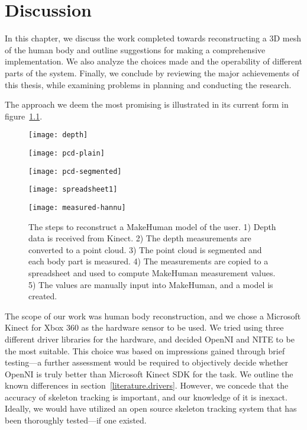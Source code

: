 \chapter{Discussion}

In this chapter, we discuss the work completed towards reconstructing a 3D mesh of the human body and outline suggestions for making a comprehensive implementation. We also analyze the choices made and the operability of different parts of the system. Finally, we conclude by reviewing the major achievements of this thesis, while examining problems in planning and conducting the research.

The approach we deem the most promising is illustrated in its current form in figure~\ref{fig:steps}.

\begin{figure}
    \centering
    
    \begin{minipage}{0.39\textwidth}
        \texttt{[image: depth]}
    \end{minipage}
    \begin{minipage}{0.60\textwidth}
        \texttt{[image: pcd-plain]}
    \end{minipage}

    \texttt{[image: pcd-segmented]}
    
    \begin{minipage}{0.56\textwidth}
        \texttt{[image: spreadsheet1]}
    \end{minipage}
    \begin{minipage}{0.43\textwidth}
        \texttt{[image: measured-hannu]}
    \end{minipage}
    
    \caption{The steps to reconstruct a MakeHuman model of the user. 1) Depth data is received from Kinect. 2) The depth measurements are converted to a point cloud. 3) The point cloud is segmented and each body part is measured. 4) The measurements are copied to a spreadsheet and used to compute MakeHuman measurement values. 5) The values are manually input into MakeHuman, and a model is created.}
    \label{fig:steps}
\end{figure}

\newtopic

The scope of our work was human body reconstruction, and we chose a Microsoft Kinect for Xbox 360 as the hardware sensor to be used. We tried using three different driver libraries for the hardware, and decided OpenNI and NITE to be the most suitable. This choice was based on impressions gained through brief testing---a further assessment would be required to objectively decide whether OpenNI is truly better than Microsoft Kinect SDK for the task. We outline the known differences in section~\ref{literature.drivers}. However, we concede that the accuracy of skeleton tracking is important, and our knowledge of it is inexact. Ideally, we would have utilized an open source skeleton tracking system that has been thoroughly tested---if one existed.

